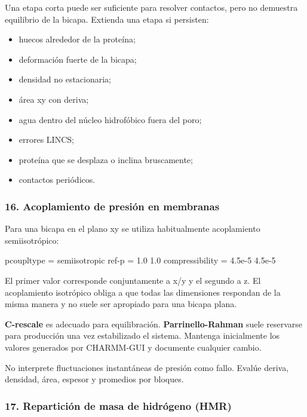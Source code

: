 \documentclass[
  spanish,
  11pt,
  a4paper]{article}
\newenvironment{Shaded}{\begin{snugshade}}{\end{snugshade}}
\newcommand{\DataTypeTok}[1]{\textcolor[rgb]{0.13,0.29,0.53}{#1}}
\newcommand{\OtherTok}[1]{\textcolor[rgb]{0.56,0.35,0.01}{#1}}
\newcommand{\StringTok}[1]{\textcolor[rgb]{0.31,0.60,0.02}{#1}}
\providecommand{\tightlist}{%
  \setlength{\itemsep}{0pt}\setlength{\parskip}{0pt}}
\begin{document}
Una etapa corta puede ser suficiente para resolver contactos, pero no
demuestra equilibrio de la bicapa. Extienda una etapa si persisten:

\begin{itemize}
\tightlist
\item
  huecos alrededor de la proteína;
\item
  deformación fuerte de la bicapa;
\item
  densidad no estacionaria;
\item
  área xy con deriva;
\item
  agua dentro del núcleo hidrofóbico fuera del poro;
\item
  errores LINCS;
\item
  proteína que se desplaza o inclina bruscamente;
\item
  contactos periódicos.
\end{itemize}

\subsubsection{16. Acoplamiento de presión en
membranas}\label{acoplamiento-de-presiuxf3n-en-membranas}

Para una bicapa en el plano xy se utiliza habitualmente acoplamiento
semiisotrópico:

\begin{Shaded}
\begin{Highlighting}[]
\DataTypeTok{pcoupltype       }\OtherTok{=}\StringTok{ semiisotropic}
\DataTypeTok{ref{-}p            }\OtherTok{=}\StringTok{ 1.0 1.0}
\DataTypeTok{compressibility  }\OtherTok{=}\StringTok{ 4.5e{-}5 4.5e{-}5}
\end{Highlighting}
\end{Shaded}

El primer valor corresponde conjuntamente a x/y y el segundo a z. El
acoplamiento isotrópico obliga a que todas las dimensiones respondan de
la misma manera y no suele ser apropiado para una bicapa plana.

\textbf{C-rescale} es adecuado para equilibración.
\textbf{Parrinello-Rahman} suele reservarse para producción una vez
estabilizado el sistema. Mantenga inicialmente los valores generados por
CHARMM-GUI y documente cualquier cambio.

No interprete fluctuaciones instantáneas de presión como fallo. Evalúe
deriva, densidad, área, espesor y promedios por bloques.

\subsubsection{17. Repartición de masa de hidrógeno
(HMR)}\label{reparticiuxf3n-de-masa-de-hidruxf3geno-hmr}
\end{document}
